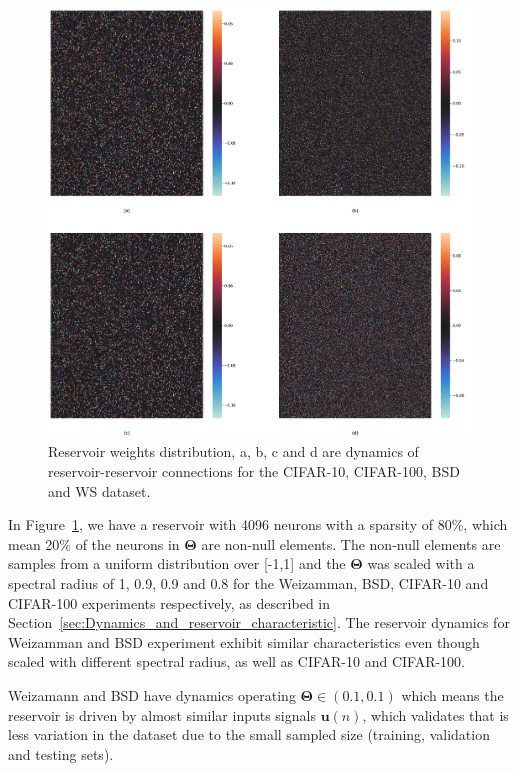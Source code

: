 \documentclass{WitsPhysicsReport}
\begin{document}
\begin{figure}[H]
\centering
  \includegraphics[width=1\textwidth]{Figure/Results/Reservoir_activity_Reservoir_weights_activity_.png}
 \caption{Reservoir weights distribution, a, b, c and d are dynamics of reservoir-reservoir connections for the CIFAR-10, CIFAR-100, BSD and WS dataset.}
 \label{fig:reservoir_activity}
\end{figure}

In Figure~\ref{fig:reservoir_activity}, we have a reservoir with 4096 neurons with a sparsity of 80\%, which mean 20\% of the neurons in  ${\mathbf{\Theta}}$ are non-null elements. The non-null elements are samples from a uniform distribution over [-1,1] and the ${\mathbf{\Theta}}$ was scaled with a spectral radius of 1, 0.9, 0.9 and 0.8 for the Weizamman, BSD, CIFAR-10 and CIFAR-100 experiments respectively, as described in Section~\ref{sec:Dynamics_and_reservoir_characteristic}.  The reservoir dynamics for Weizamman and BSD experiment exhibit similar characteristics even though scaled with different spectral radius, as well as CIFAR-10 and CIFAR-100. 

Weizamann and BSD have dynamics operating ${\mathbf{\Theta}} \in(0.1, 0.1)$ which means the reservoir is driven by almost similar inputs signals $\mathbf{u}(n)$, which validates that is less variation in the dataset due to the small sampled size (training, validation and testing sets). 
\end{document}
